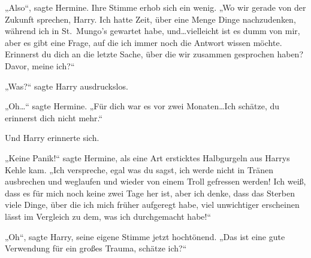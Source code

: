 „Also“, sagte Hermine. Ihre Stimme erhob sich ein wenig. „Wo wir gerade von der Zukunft sprechen, Harry. Ich hatte Zeit, über eine Menge Dinge nachzudenken, während ich in St.~Mungo’s gewartet habe, und…vielleicht ist es dumm von mir, aber es gibt eine Frage, auf die ich immer noch die Antwort wissen möchte. Erinnerst du dich an die letzte Sache, über die wir zusammen gesprochen haben? Davor, meine ich?“

„Was?“ sagte Harry ausdruckslos.

„Oh…“ sagte Hermine. „Für dich war es vor zwei Monaten…Ich schätze, du erinnerst dich nicht mehr.“

Und Harry erinnerte sich.

„Keine Panik!“ sagte Hermine, als eine Art ersticktes Halbgurgeln aus Harrys Kehle kam. „Ich verspreche, egal was du sagst, ich werde nicht in Tränen ausbrechen und weglaufen und wieder von einem Troll gefressen werden! Ich weiß, dass es für mich noch keine zwei Tage her ist, aber ich denke, dass das Sterben viele Dinge, über die ich mich früher aufgeregt habe, viel unwichtiger erscheinen lässt im Vergleich zu dem, was ich durchgemacht habe!“

„Oh“, sagte Harry, seine eigene Stimme jetzt hochtönend. „Das ist eine gute Verwendung für ein großes Trauma, schätze ich?“


